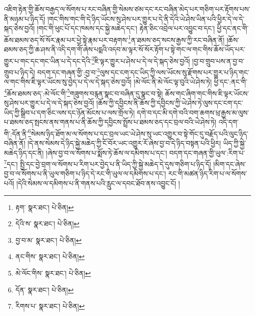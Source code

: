 འཇིག་རྟེན་གྱི་ཆོས་བརྒྱད་ལ་སོགས་པ་རང་བཞིན་གྱི་སེམས་ཙམ་དང་རང་བཞིན་མེད་པར་གཅིག་པར་རྟོགས་པས་ནི་མཉམ་པ་ཉིད་དོ། །གང་གིས་གང་གི་དེ་ཉིད་ཡོངས་སུ་ཤེས་པར་གྱུར་པ་དེ་ནི་དེའི་ཡེ་ཤེས་ཡིན་པའི་ཕྱིར་དེ་ལ་དེ་སྐད་ཅེས་བྱའོ། །གང་གི་ཕུང་པོ་དང་ཁམས་དང་སྐྱེ་མཆེད་དང་། རྟེན་ཅིང་འབྲེལ་པར་འབྱུང་བ་དང་། ཕྱི་དང་ནང་གི་ཆོས་ཐམས་ཅད་སོ་སོར་རྣམ་པར་ཕྱེ་སྟེ་རྣམ་པར་བརྟགས་\footnote{རྟག་  སྣར་ཐང་།  པེ་ཅིན། }ན་ཐམས་ཅད་སངས་རྒྱས་ཀྱི་རང་བཞིན་ནོ། །ཆོས་ཐམས་ཅད་ཀྱི་ཆ་ཤས་ནི་འདི་དག་གོ་ཞེས་པདྨའི་འདབ་མ་ལྟར་སོ་སོར་རྟོག་པ་སྟེ་གང་ལ་གང་གིས་ཆོས་ཡོད་པར་གྱུར་པ་གང་དང་གང་ཡིན་པ་དེ་དང་དེའི་\footnote{དེའི་ས་  སྣར་ཐང་།  པེ་ཅིན། }ཇི་ལྟར་གྱུར་པ་ཤེས་པ་དེ་ལ་དེ་སྐད་ཅེས་བྱའོ། །བྱ་བ་གྲུབ་པས་ན་བྱ་བ་གྲུབ་པ་ཉིད་དེ། བདག་དང་གཞན་གྱི་:བྱ་བ་\footnote{བྱ་བ་མ་  སྣར་ཐང་།  པེ་ཅིན། }ལུས་དང་ངག་དང་ཡིད་ཀྱི་ལས་ཡོངས་སུ་རྫོགས་པར་གྱུར་པ་ཉིད་གང་ལ་གང་གིས་ཇི་ལྟར་ཡོངས་སུ་བྱེད་པ་དེ་ལ་དེ་སྐད་ཅེས་བྱའོ། །མེ་ལོང་ནི་མེ་ལོང་ལྟ་བུའི་ཡེ་ཤེས་ཏེ། ཕྱི་དང་:ནང་གི་\footnote{ནང་གིས་  སྣར་ཐང་།  པེ་ཅིན། }ཆོས་ཐམས་ཅད་:མེ་ལོང་གི་\footnote{མེ་ལོང་གིས་  སྣར་ཐང་།  པེ་ཅིན། }གཟུགས་བརྙན་སྣང་བ་བཞིན་དུ་སྣང་བ་སྟེ། ཆོས་གང་ཞིག་གང་གིས་ཇི་ལྟར་ཡོངས་སུ་ཤེས་པར་གྱུར་པ་དེ་ལ་དེ་སྐད་ཅེས་བྱའོ། །ཆོས་ཀྱི་དབྱིངས་ནི་ཆོས་ཀྱི་དབྱིངས་ཀྱི་ཡེ་ཤེས་ཏེ་ལུས་དང་ངག་དང་ཡིད་ཀྱི་སྒྲིབ་པ་དག་ཅིང་ལས་དང་ཉོན་མོངས་པ་ལས་གྲོལ་ཏེ། དགེ་བ་དང་མི་དགེ་བའི་བག་ཆགས་ཕྲ་རྒྱས་མ་ལུས་པ་ཐམས་ཅད་སྤངས་ནས་གནས་པ་ནི་ཆོས་ཀྱི་དབྱིངས་སྤྲོས་པ་ཐམས་ཅད་དང་བྲལ་བའི་ཡེ་ཤེས་ཏེ། འདི་དག་གི་:དོན་ནི་\footnote{དོན་  སྣར་ཐང་།  པེ་ཅིན། }སེམས་ཉིད་ཐོག་མ་ལ་སོགས་པ་དང་བྲལ་ཡང་ཡེ་ཤེས་སུ་ཡང་འགྱུར་བ་སྟེ་གོང་དུ་བརྗོད་པའི་ལུང་ཉིད་བཞིན་ནོ། །དེ་ནས་སེམས་དེ་ཉིད་སྐྱེ་མཆེད་ཀྱི་ངོ་བོར་ཡང་འགྱུར་རོ་ཞེས་བྱ་བ་དེ་ཉིད་བསྟན་པའི་ཕྱིར། ཡིད་ཀྱི་སྐྱེ་མཆེད་ཉིད་དང་ནི། །ཞེས་བྱ་བ་ལ་སོགས་པ་སྨོས་ཏེ་ཆོས་ལ་དམིགས་པ་དང་། བདག་དང་གཞན་གྱི་ཡུལ་:རིག་པ་\footnote{རིགས་པ་  སྣར་ཐང་།  པེ་ཅིན། }དང་། སྤྱི་དང་བྱེ་བྲག་ལ་སོགས་པ་རིག་པར་བྱེད་པ་ནི་ཡིད་ཀྱི་སྐྱེ་མཆེད་དེ་དུས་གཅིག་པ་ཉིད་དོ། །མིག་དང་ཞེས་བྱ་བ་ལ་སོགས་པ་ནི་ཡུལ་གཅིག་པ་ཉིད་དེ་རང་གི་ཡུལ་ལ་དམིགས་པ་དང་། རང་གི་མཚན་ཉིད་རིག་པ་ལ་སོགས་པའོ། །དེའི་སེམས་ལ་དམིགས་པ་ནི་གནས་པའི་རླུང་ལ་དབང་ཐོབ་ནས་འབྱུང་ངོ། །
